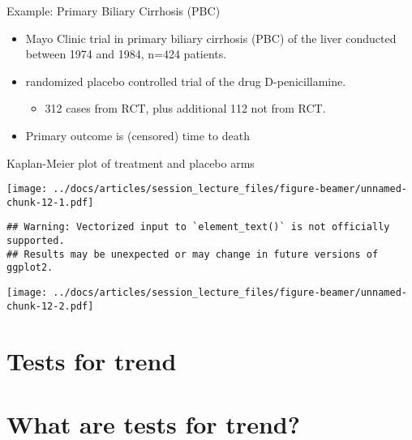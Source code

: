 \documentclass[
  ignorenonframetext,
]{beamer}
\providecommand{\tightlist}{%
  \setlength{\itemsep}{0pt}\setlength{\parskip}{0pt}}
\begin{document}
\begin{frame}{Example: Primary Biliary Cirrhosis (PBC)}
\protect\hypertarget{example-primary-biliary-cirrhosis-pbc}{}

\begin{itemize}
\tightlist
\item
  Mayo Clinic trial in primary biliary cirrhosis (PBC) of the liver
  conducted between 1974 and 1984, n=424 patients.
\item
  randomized placebo controlled trial of the drug D-penicillamine.

  \begin{itemize}
  \tightlist
  \item
    312 cases from RCT, plus additional 112 not from RCT.
  \end{itemize}
\item
  Primary outcome is (censored) time to death
\end{itemize}

\end{frame}

\begin{frame}[fragile]{Kaplan-Meier plot of treatment and placebo arms}
\protect\hypertarget{kaplan-meier-plot-of-treatment-and-placebo-arms}{}

\texttt{[image: ../docs/articles/session\_lecture\_files/figure-beamer/unnamed-chunk-12-1.pdf]}

\begin{verbatim}
## Warning: Vectorized input to `element_text()` is not officially supported.
## Results may be unexpected or may change in future versions of ggplot2.
\end{verbatim}

\texttt{[image: ../docs/articles/session\_lecture\_files/figure-beamer/unnamed-chunk-12-2.pdf]}

\end{frame}

\hypertarget{tests-for-trend}{%
\section{Tests for trend}\label{tests-for-trend}}

\hypertarget{what-are-tests-for-trend}{%
\section{What are tests for trend?}\label{what-are-tests-for-trend}}
\end{document}
